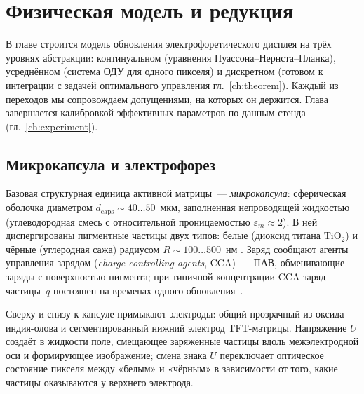 \chapter{Физическая модель и редукция}\label{ch:model}

В главе строится модель обновления электрофоретического дисплея на трёх
уровнях абстракции: континуальном (уравнения Пуассона--Нернста--Планка),
усреднённом (система ОДУ для одного пикселя) и дискретном (готовом к
интеграции с задачей оптимального управления гл.~\ref{ch:theorem}). Каждый из
переходов мы сопровождаем допущениями, на которых он держится.
Глава завершается калибровкой эффективных параметров по данным
стенда (гл.~\ref{ch:experiment}).

\section{Микрокапсула и электрофорез}\label{sec:model-capsule}

Базовая структурная единица активной матрицы~--- \emph{микрокапсула}:
сферическая оболочка диаметром $d_{\mathrm{caps}}\sim 40\ldots 50$~мкм,
заполненная непроводящей жидкостью (углеводородная смесь с относительной
проницаемостью $\varepsilon_m \approx 2$). В ней диспергированы пигментные
частицы двух типов: белые (диоксид титана $\mathrm{TiO}_2$) и чёрные
(углеродная сажа) радиусом $R \sim 100\ldots 500$~нм
\cite{comiskey1998_nature, yang2021_mechanisms}. Заряд сообщают агенты
управления зарядом (\emph{charge controlling agents}, CCA)~--- ПАВ,
обменивающие заряды с поверхностью пигмента; при типичной концентрации CCA
заряд частицы~$q$ постоянен на временах одного
обновления~\cite{yang2021_mechanisms}.

Сверху и снизу к капсуле примыкают электроды: общий прозрачный из оксида
индия-олова и сегментированный нижний электрод TFT-матрицы. Напряжение
$U$ создаёт в жидкости поле, смещающее заряженные частицы вдоль
межэлектродной оси и формирующее изображение; смена знака $U$ переключает
оптическое состояние пикселя между «белым» и «чёрным» в зависимости от того,
какие частицы оказываются у верхнего электрода.

